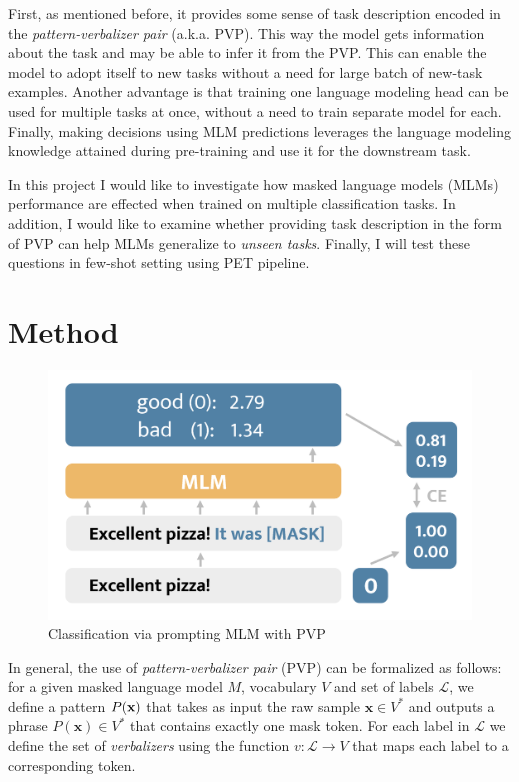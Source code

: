 \documentclass[11pt,a4paper]{article}
\begin{document}
First, as mentioned before, it provides some sense of task description encoded in the \textit{pattern-verbalizer pair} (a.k.a. PVP).
This way the model gets information about the task and may be able to infer it from the PVP.
This can enable the model to adopt itself to new tasks without a need for large batch of new-task examples.
Another advantage is that training one language modeling head can be used for multiple tasks at once, without a need to train separate model for each.
Finally, making decisions using MLM predictions leverages the language modeling knowledge attained during pre-training and use it for the downstream task.

In this project I would like to investigate how masked language models (MLMs) performance are effected when trained on multiple classification tasks.
In addition, I would like to examine whether providing task description in the form of PVP can help MLMs generalize to \textit{unseen tasks}.
Finally, I will test these questions in few-shot setting using PET pipeline.

\section{Method}
\label{sec:method}

\begin{figure}[h]
	\centering
	\includegraphics[width=\linewidth]{mlm_classification}
	\caption{Classification via prompting MLM with PVP}
	\label{normal_case}
\end{figure}

In general, the use of \textit{pattern-verbalizer pair} (PVP) can be formalized as follows: for a given masked language model $M$, vocabulary $V$ and set of labels $\mathcal{L}$, we define a pattern $P(\textbf{\text{x}})$ that takes as input the raw sample $\textbf{x}\in{}V^*$ and outputs a phrase $P(\textbf{x})\in{}V^*$ that contains exactly one mask token.
For each label in $\mathcal{L}$ we define the set of \textit{verbalizers} using the function $v:\mathcal{L}\rightarrow{}V$ that maps each label to a corresponding token.
\end{document}
